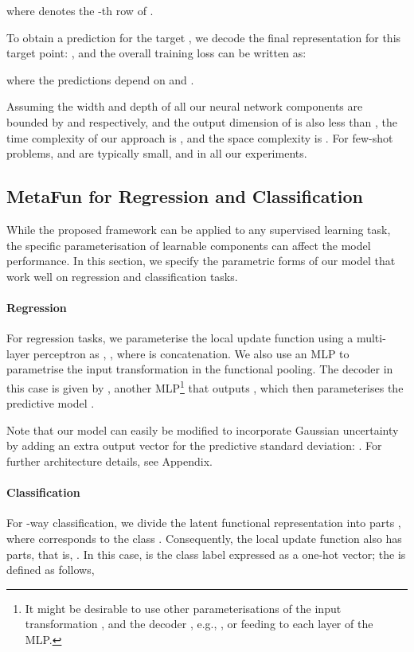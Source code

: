 \documentclass{article}
\theoremstyle{definition}
\begin{document}
where  denotes the -th row of .

To obtain a prediction  for the target , we decode the final representation for this target point: , and the overall training loss can be written as:

where the predictions  depend on  and .

Assuming the width and depth of all our neural network components are bounded by  and  respectively, and the output dimension of  is also less than , the time complexity of our approach is , and the space complexity is . For few-shot problems,  and  are typically small, and  in all our experiments.


\subsection{MetaFun for Regression and Classification} \label{sub:regression-and-classification}


While the proposed framework can be applied to any supervised learning task, the specific parameterisation of learnable components can affect the model performance.
In this section, we specify the parametric forms of our model that work well on regression and classification tasks.
\paragraph{Regression} For regression tasks, we parameterise the local update function  using a multi-layer perceptron as , , where  is concatenation.
We also use an \gls{MLP} to parametrise the input transformation  in the functional pooling.
The decoder in this case is given by , another \gls{MLP}\footnote{
It might be desirable to use other parameterisations of the input transformation , and the decoder , e.g., , or feeding  to each layer of the \gls{MLP}.
} that outputs , which then parameterises the predictive model .

Note that our model can easily be modified to incorporate Gaussian uncertainty by adding an extra output vector for the predictive standard deviation: . For further architecture details, see Appendix.

\paragraph{Classification} For -way classification, we divide the latent functional representation  into  parts , where  corresponds to the class . 
Consequently, the local update function  also has  parts, that is, . In this case,  is the class label expressed as a one-hot vector; the  is defined as follows,
\end{document}
